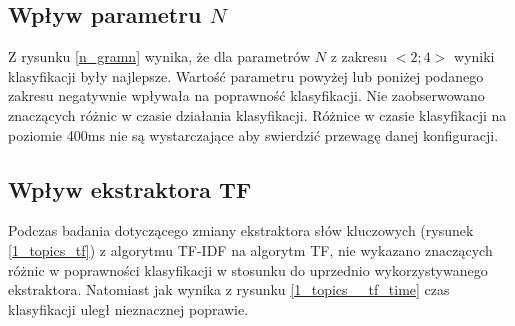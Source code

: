 \documentclass{classrep}
\begin{document}
\subsection{Wpływ parametru $N$}
Z rysunku \ref{n_gramn} wynika, że dla parametrów $N$ z zakresu $<2;4>$ wyniki klasyfikacji były najlepsze.
Wartość parametru powyżej lub poniżej podanego zakresu negatywnie wpływała na poprawność klasyfikacji.
Nie zaobserwowano znaczących różnic w czasie działania klasyfikacji. Różnice w czasie klasyfikacji
na poziomie 400ms nie są wystarczające aby swierdzić przewagę danej konfiguracji.

\subsection{Wpływ ekstraktora TF}
Podczas badania dotyczącego zmiany ekstraktora słów kluczowych (rysunek \ref{1_topics_tf}) z
algorytmu TF-IDF na algorytm TF,
nie wykazano znaczących różnic w poprawności klasyfikacji w stosunku do uprzednio
wykorzystywanego ekstraktora. Natomiast jak wynika z rysunku \ref{1_topics__tf_time} czas klasyfikacji
uległ nieznacznej poprawie.
%
\end{document}
